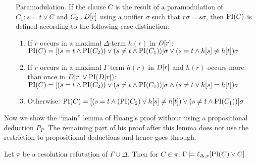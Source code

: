 \documentclass[,%
	paper=a4,%
	DIV14, 
	liststotoc,
	bibtotoc,
	draft=false,%
	numbers=noendperiod
]{scrartcl}
\newcommand{\lif}[1]{\lift{\Delta}{#1}{x}}
\begin{document}
\begin{defi}
\begin{itemize}
    \item[Paramodulation.]
  \label{def:PI_paramod}
      If the clause $C$ is the result of a paramodulation of $C_1: s=t \lor C$ and $C_2: D[r]$ using a unifier $\sigma$ such that $r\sigma = s\sigma$, then $\operatorname{PI}(C)$ is defined according to the following  case distinction:
      \begin{enumerate}
        \item If $r$ occurs in a maximal $\Delta$-term $h(r)$ in $D[r]$:
          \label{def:PI_paramod_1}
          \newline
          $\operatorname{PI}(C) = [ ( s=t \land \operatorname{PI}(C_2) ) \lor (s\neq t \land \operatorname{PI}(C_1)) ]\sigma \lor (s=t \land h[s] \neq h[t])\sigma$
        \item If $r$ occurs in a maximal $\Gamma$-term $h(r)$ in $D[r]$ and $h(r)$ occurs more than once in $D[r] \lor \operatorname{PI}(D[r])$:
          \label{def:PI_paramod_2}
          \newline
          $\operatorname{PI}(C) = [ ( s=t \land \operatorname{PI}(C_2) ) \lor (s\neq t \land \operatorname{PI}(C_1)) ]\sigma \land (s\neq t \lor h[s] = h[t])\sigma$
        \item Otherwise:
          \label{def:PI_paramod_3}
          \newline
          $\operatorname{PI}(C) = [ ( s=t \land (\operatorname{PI}(C_2) \lor h[s] \neq h[t] ) \lor (s\neq t \land \operatorname{PI}(C_1)) ]\sigma$ \qedhere

      \end{enumerate}
  \end{itemize}
\end{defi}


Now we show the ``main'' lemma of Huang's proof without using a propositional deduction $P_P$.
The remaining part of his proof after this lemma does not use the restriction to propositional deductions and hence goes through.

\begin{lemma}
	Let $\pi$ be a resolution refutation of $\Gamma \cup \Delta$.
	Then for $C \in \pi$,
	$ \Gamma \entails \lif{\PI(C) \lor C} $.
	\label{lemma:gamma_entails_interpolant}
\end{lemma}
\end{document}

